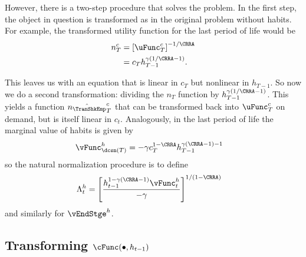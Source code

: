\documentclass[\econtexRoot/SolvingMicroDSOPs]{subfiles}
\begin{document}
However, there is a two-step procedure that solves the problem.  In
the first step, the object in question is transformed as in the
original problem without habits.  For example, the transformed utility
function for the last period of life would be
\begin{equation}\begin{gathered}\begin{aligned}
  n_{T}^{c}  & = \left[\uFunc^{c}_{T}\right]^{-1/\CRRA}
  \\        & = {c}_{T}h_{T-1}^{\gamma(1/\CRRA-1)}.
\end{aligned}\end{gathered}\end{equation}

This leaves us with an equation that is linear in ${c}_{T}$ but
nonlinear in $h_{T-1}$.  So now we do a second transformation:
dividing the $n_{T}$ function by $h_{T-1}^{\gamma(1/\CRRA-1)}$.  This
yields a function $\hat{n_{\TranShkEmp}}_{T}^{c}$ that can be transformed back into
$\uFunc^{c}_{T}$ on demand, but is itself linear in ${c}_{t}.$  Analogously,
in the last period of life the marginal value of habits is given by
\begin{equation*}\begin{gathered}\begin{aligned}
  {\vFunc}_{\dcsn(T)}^{h}  & = -\gamma {c}_{T}^{1-\CRRA}h_{T-1}^{\gamma(\CRRA-1)-1}
\end{aligned}\end{gathered}\end{equation*}
so the natural normalization procedure is to define
\begin{equation}\begin{gathered}\begin{aligned}
  \Lambda_{t}^{h}
  & =                           \left[\frac{h_{t-1}^{1-\gamma(\CRRA-1)}{\vFunc}_{t}^{h}}{-\gamma}\right]^{1/(1-\CRRA)}
\end{aligned}\end{gathered}\end{equation}
and similarly for $\vEndStge^{h}$.


\hypertarget{Transforming-cFunc}{}
\subsection{Transforming $\cFunc(\bullet,h_{t-1})$}
\end{document}
